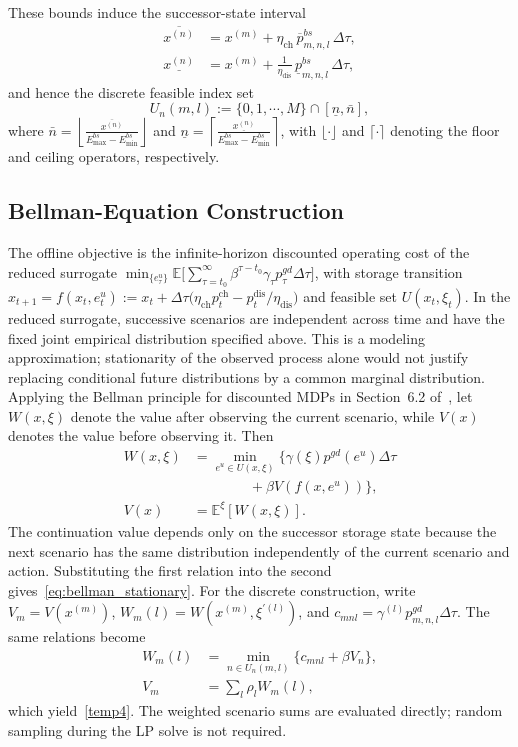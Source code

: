 \documentclass[a4paper,fleqn]{cas-dc}
\theoremstyle{plain}
\theoremstyle{remark}
\theoremstyle{plain}
\begin{document}
These bounds induce the successor-state interval
\begin{align*}
\overline{x^{(n)}} &= x^{(m)} + \eta_{\text{ch}}\,\overline{p}^{bs}_{m,n,l}\, \Delta \tau, \\
\underline{x^{(n)}} &= x^{(m)} + \frac{1}{\eta_{\text{dis}}}\,\underline{p}^{bs}_{m,n,l}\, \Delta \tau,
\end{align*}
and hence the discrete feasible index set
\begin{equation}\label{temp5}
U_n(m,l) := \{0,1, \cdots, M\} \cap[\underline{n}, \bar{n}],
\end{equation}
where $\bar{n}=\left\lfloor\frac{\overline{x^{(n)}}}{E_{\max }^{bs}-E_{\min }^{bs}}\right\rfloor$ and $\underline{n}=\left\lceil\frac{\underline{x^{(n)}}}{E_{\max }^{bs}-E_{\min }^{bs}}\right\rceil$, with $\lfloor \cdot \rfloor$ and $\lceil \cdot \rceil$ denoting the floor and ceiling operators, respectively.

\subsection{Bellman-Equation Construction}
The offline objective is the infinite-horizon discounted operating cost of the reduced surrogate
$\min_{\{e_\tau^u\}} \mathbb{E}\big[\sum_{\tau=t_0}^{\infty} \beta^{\tau-t_0}\gamma_\tau p_\tau^{gd}\Delta\tau\big]$,
with storage transition $x_{t+1}=f(x_t,e_t^u):=x_t+\Delta\tau\big(\eta_{\text{ch}} p_t^{\text{ch}}-p_t^{\text{dis}}/\eta_{\text{dis}}\big)$ and feasible set $U(x_t,\xi_t)$.
In the reduced surrogate, successive scenarios are independent across time and have the fixed joint empirical distribution specified above. This is a modeling approximation; stationarity of the observed process alone would not justify replacing conditional future distributions by a common marginal distribution. Applying the Bellman principle for discounted MDPs in Section~6.2 of~\cite{puterman1994_mdp_book}, let $W(x,\xi)$ denote the value after observing the current scenario, while $V(x)$ denotes the value before observing it. Then
\[
\begin{aligned}
W(x,\xi)&=\min_{e^u\in U(x,\xi)}\big\{\gamma(\xi)p^{gd}(e^u)\Delta\tau\\
&\qquad\qquad +\beta V(f(x,e^u))\big\},\\
V(x)&=\mathbb{E}^{\xi}[W(x,\xi)].
\end{aligned}
\]
The continuation value depends only on the successor storage state because the next scenario has the same distribution independently of the current scenario and action. Substituting the first relation into the second gives~\eqref{eq:bellman_stationary}. For the discrete construction, write $V_m=V(x^{(m)})$, $W_m(l)=W(x^{(m)},\xi^{\prime(l)})$, and $c_{mnl}=\gamma^{(l)}p_{m,n,l}^{gd}\Delta\tau$. The same relations become
\[
\begin{aligned}
W_m(l)&=\min_{n\in U_n(m,l)}\{c_{mnl}+\beta V_n\},\\
V_m&=\sum_l\rho_l W_m(l),
\end{aligned}
\]
which yield~\eqref{temp4}. The weighted scenario sums are evaluated directly; random sampling during the LP solve is not required.
\end{document}
